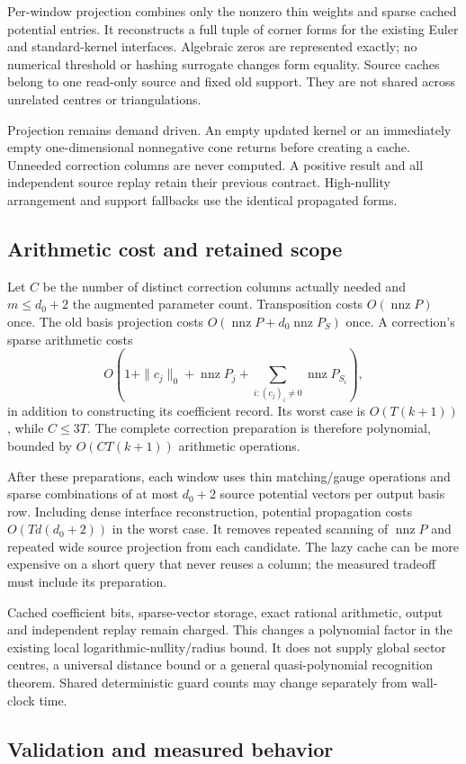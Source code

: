 Per-window projection combines only the nonzero thin weights and sparse
cached potential entries. It reconstructs a full tuple of corner forms for
the existing Euler and standard-kernel interfaces. Algebraic zeros are
represented exactly; no numerical threshold or hashing surrogate changes
form equality. Source caches belong to one read-only source and fixed old
support. They are not shared across unrelated centres or triangulations.

Projection remains demand driven. An empty updated kernel or an immediately
empty one-dimensional nonnegative cone returns before creating a cache.
Unneeded correction columns are never computed. A positive result and all
independent source replay retain their previous contract. High-nullity
arrangement and support fallbacks use the identical propagated forms.

\subsection{Arithmetic cost and retained scope}

Let $C$ be the number of distinct correction columns actually needed and
$m\le d_0+2$ the augmented parameter count. Transposition costs
$O(\operatorname{nnz}P)$ once. The old basis projection costs
$O(\operatorname{nnz}P+d_0\operatorname{nnz}P_S)$ once. A correction's sparse
arithmetic costs
\[
 O\!\left(1+\|c_j\|_0+\operatorname{nnz}P_j+
       \sum_{i:(c_j)_i\ne0}\operatorname{nnz}P_{S_i}\right),
\]
in addition to constructing its coefficient record. Its worst case is
$O(T(k+1))$, while $C\le3T$. The complete correction preparation is
therefore polynomial, bounded by $O(CT(k+1))$ arithmetic operations.

After these preparations, each window uses thin matching/gauge operations
and sparse combinations of at most $d_0+2$ source potential vectors per
output basis row. Including dense interface reconstruction, potential
propagation costs $O(Td(d_0+2))$ in the worst case. It removes repeated
scanning of $\operatorname{nnz}P$ and repeated wide source projection from
each candidate. The lazy cache can be more expensive on a short query that
never reuses a column; the measured tradeoff must include its preparation.

Cached coefficient bits, sparse-vector storage, exact rational arithmetic,
output and independent replay remain charged. This changes a polynomial
factor in the existing local logarithmic-nullity/radius bound. It does not
supply global sector centres, a universal distance bound or a general
quasi-polynomial recognition theorem. Shared deterministic guard counts may
change separately from wall-clock time.

\subsection{Validation and measured behavior}

